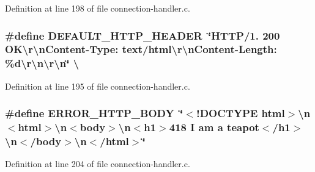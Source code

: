 Definition at line 198 of file connection-\/handler.\-c.

\hypertarget{connection-handler_8c_a70992e4154471284e27ecd7566edbcb1}{
\subsubsection[{D\-E\-F\-A\-U\-L\-T\-\_\-\-H\-T\-T\-P\-\_\-\-H\-E\-A\-D\-E\-R}]{\setlength{\rightskip}{0pt plus 5cm}\#define D\-E\-F\-A\-U\-L\-T\-\_\-\-H\-T\-T\-P\-\_\-\-H\-E\-A\-D\-E\-R~\char`\"{}H\-T\-T\-P/1. 200 O\-K\textbackslash{}r\textbackslash{}n\-Content-\/Type\-: text/html\textbackslash{}r\textbackslash{}n\-Content-\/Length\-: \%d\textbackslash{}r\textbackslash{}n\textbackslash{}r\textbackslash{}n\char`\"{} \textbackslash{}}}\label{connection-handler_8c_a70992e4154471284e27ecd7566edbcb1}


Definition at line 195 of file connection-\/handler.\-c.

\hypertarget{connection-handler_8c_a5ec8531b329b421d3b4c17cc17c37d5c}{
\subsubsection[{E\-R\-R\-O\-R\-\_\-\-H\-T\-T\-P\-\_\-\-B\-O\-D\-Y}]{\setlength{\rightskip}{0pt plus 5cm}\#define E\-R\-R\-O\-R\-\_\-\-H\-T\-T\-P\-\_\-\-B\-O\-D\-Y~\char`\"{}$<$!D\-O\-C\-T\-Y\-P\-E html$>$\textbackslash{}n$<$html$>$\textbackslash{}n$<$body$>$\textbackslash{}n$<$h1$>$418 I am a teapot$<$/h1$>$\textbackslash{}n$<$/body$>$\textbackslash{}n$<$/html$>$\char`\"{}}}\label{connection-handler_8c_a5ec8531b329b421d3b4c17cc17c37d5c}


Definition at line 204 of file connection-\/handler.\-c.

